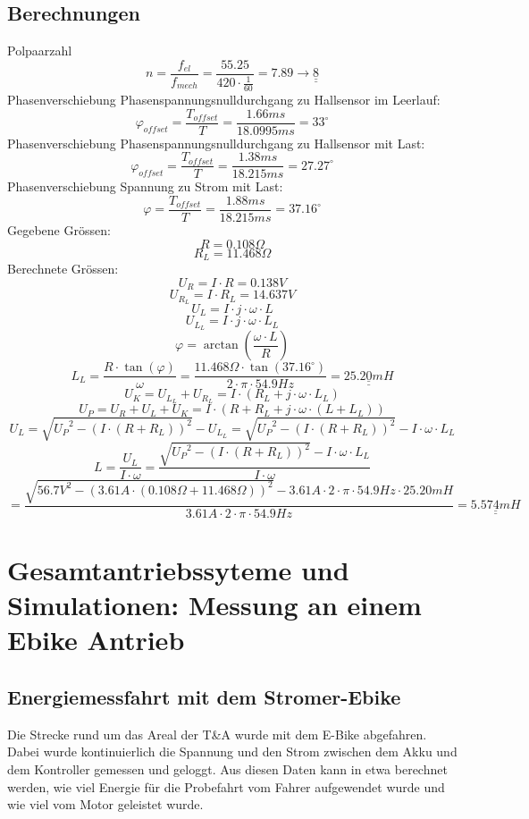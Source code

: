 \documentclass[a4,paper,fleqn]{article}
\newcommand{\uuline}[1]{{\underline{\underline{#1}}}}
\begin{document}
\subsection{Berechnungen}
Polpaarzahl
\[ n = \frac{f_{el}}{f_{mech}} = \frac{55.25}{420 \cdot \frac{1}{60}} = 7.89 \to \uuline{8} \]
Phasenverschiebung Phasenspannungsnulldurchgang zu Hallsensor im Leerlauf: 
\[ \varphi_{offset} = \frac{T_{offset}}{T} = \frac{1.66 ms}{18.0995 ms} = 33^\circ \]
Phasenverschiebung Phasenspannungsnulldurchgang zu Hallsensor mit Last: 
\[ \varphi_{offset} = \frac{T_{offset}}{T} = \frac{1.38 ms}{18.215 ms} = 27.27^\circ \]
Phasenverschiebung Spannung zu Strom mit Last: 
\[ \varphi = \frac{T_{offset}}{T} = \frac{1.88 ms}{18.215 ms} = 37.16^\circ \]
Gegebene Grössen: 
\[ R = 0.108 \Omega \]
\[ R_L = 11.468 \Omega \]
Berechnete Grössen: 
\[ U_R = I \cdot R = 0.138 V \]
\[ U_{R_L} = I \cdot R_L = 14.637 V \]
\[ U_{L} = I \cdot j \cdot \omega \cdot L \]
\[ U_{L_L} = I \cdot j \cdot \omega \cdot L_L \]
\[ \varphi = \arctan\left(\frac{\omega \cdot L}{R}\right) \]
\[ L_L = \frac{R \cdot \tan(\varphi)}{\omega} 
= \frac{11.468 \Omega \cdot \tan(37.16^\circ)}{2 \cdot \pi \cdot 54.9 Hz} 
= \uuline{25.20 mH} \]
\[ U_K = U_{L_L} + U_{R_L}  = I \cdot (R_L + j \cdot \omega \cdot L_L)\]
\[ U_P = U_R + U_L + U_K = I \cdot (R + R_L + j \cdot \omega \cdot (L + L_L)) \]
\[ U_L = \sqrt{{U_P}^2 - (I \cdot (R + R_L))^2} - U_{L_L} 
= \sqrt{{U_P}^2 - (I \cdot (R + R_L))^2} - I \cdot \omega \cdot L_L \]
\[ L = \frac{U_L}{I \cdot \omega} 
= \frac{\sqrt{{U_P}^2 - (I \cdot (R + R_L))^2} - I \cdot \omega \cdot L_L}
{I \cdot \omega} \]
\[ = \frac{\sqrt{{56.7V}^2 - (3.61A \cdot (0.108 \Omega + 11.468 \Omega))^2} 
- 3.61A \cdot 2 \cdot \pi \cdot 54.9Hz \cdot 25.20 mH}
{3.61A \cdot 2 \cdot \pi \cdot 54.9Hz} = \uuline{5.574 mH} \]

\section{Gesamtantriebssyteme und Simulationen: Messung an einem Ebike Antrieb}

\subsection{Energiemessfahrt mit dem Stromer-Ebike}
Die Strecke rund um das Areal der T\&A wurde mit dem E-Bike abgefahren. Dabei 
wurde kontinuierlich die Spannung und den Strom zwischen dem Akku und dem 
Kontroller gemessen und geloggt. Aus diesen Daten kann in etwa berechnet 
werden, wie viel Energie für die Probefahrt vom Fahrer aufgewendet wurde und 
wie viel vom Motor geleistet wurde.
\end{document}
